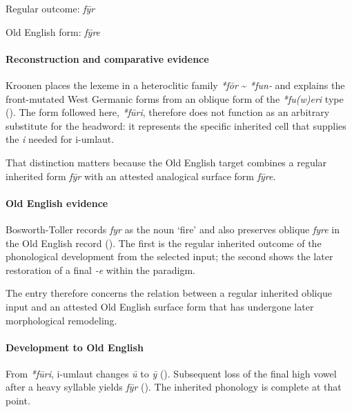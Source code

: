 \documentclass[
  british,
  a4paper,
]{article}
\begin{document}
Regular outcome: \emph{fȳr}

Old English form: \emph{fȳre}

\paragraph{Reconstruction and comparative
evidence}\label{reconstruction-and-comparative-evidence-70}

Kroonen places the lexeme in a heteroclitic family \emph{*fōr}
\textasciitilde{} \emph{*fun-} and explains the front-mutated West
Germanic forms from an oblique form of the \emph{*fu(w)eri} type
(). The form followed here,
\emph{*fūri}, therefore does not function as an arbitrary substitute for
the headword: it represents the specific inherited cell that supplies
the \emph{i} needed for i-umlaut.

That distinction matters because the Old English target combines a
regular inherited form \emph{fȳr} with an attested analogical surface
form \emph{fȳre}.

\paragraph{Old English evidence}\label{old-english-evidence-70}

Bosworth-Toller records \emph{fyr} as the noun `fire' and also preserves
oblique \emph{fyre} in the Old English record
(). The
first is the regular inherited outcome of the phonological development
from the selected input; the second shows the later restoration of a
final \emph{-e} within the paradigm.

The entry therefore concerns the relation between a regular inherited
oblique input and an attested Old English surface form that has
undergone later morphological remodeling.

\paragraph{Development to Old
English}\label{development-to-old-english-70}

From \emph{*fūri}, i-umlaut changes \emph{ū} to \emph{ȳ}
(). Subsequent loss of
the final high vowel after a heavy syllable yields \emph{fȳr}
(). The inherited
phonology is complete at that point.
\end{document}
